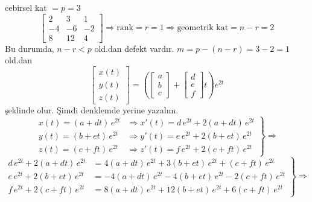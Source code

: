 \documentclass[11pt,a4paper]{article}
\begin{document}
\begin{cozum}
cebirsel kat $= p = 3$
\[
\begin{bmatrix} 2 & 3 & 1 \\ -4 & -6 & -2 \\ 8 & 12 & 4 \end{bmatrix} \Rightarrow \mathrm{rank} = r = 1 \Rightarrow \text{geometrik kat} = n-r = 2
\]
Bu durumda, $n-r<p$ old.dan defekt vardır. $m = p-(n-r) = 3-2 = 1$ old.dan
\[
\begin{bmatrix} x(t) \\ y(t) \\ z(t) \end{bmatrix} = \left(\begin{bmatrix} a \\ b \\ c \end{bmatrix} + \begin{bmatrix} d \\ e \\ f \end{bmatrix}t\right)e^{2t}
\]
şeklinde olur. Şimdi denklemde yerine yazalım.
\[
\left.\begin{aligned}
x(t) = (a+dt)\,e^{2t} &\Rightarrow x'(t) = d\,e^{2t} + 2(a+dt)\,e^{2t} \\
y(t) = (b+et)\,e^{2t} &\Rightarrow y'(t) = e\,e^{2t} + 2(b+et)\,e^{2t} \\
z(t) = (c+ft)\,e^{2t} &\Rightarrow z'(t) = f\,e^{2t} + 2(c+ft)\,e^{2t}
\end{aligned}\right\} \Rightarrow
\]
\[
\left.\begin{aligned}
d\,e^{2t} + 2(a+dt)\,e^{2t} &= 4(a+dt)\,e^{2t} + 3(b+et)\,e^{2t} + (c+ft)\,e^{2t} \\
e\,e^{2t} + 2(b+et)\,e^{2t} &= -4(a+dt)\,e^{2t} - 4(b+et)\,e^{2t} - 2(c+ft)\,e^{2t} \\
f\,e^{2t} + 2(c+ft)\,e^{2t} &= 8(a+dt)\,e^{2t} + 12(b+et)\,e^{2t} + 6(c+ft)\,e^{2t}
\end{aligned}\right\} \Rightarrow
\]


\end{cozum}
\end{document}
